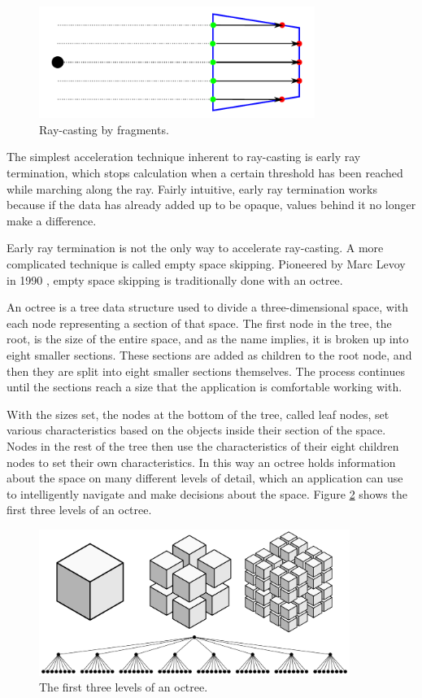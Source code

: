 \documentclass{report}
\begin{document}
\begin{figure}
\centering
\includegraphics[width=0.8\textwidth]{fragment-ray-casting.pdf}
\caption{Ray-casting by fragments.}
\label{fragment-ray-casting}
\end{figure}

The simplest acceleration technique inherent to ray-casting is early ray
termination, which stops calculation when a certain threshold has been reached
while marching along the ray.  Fairly intuitive, early ray termination works
because if the data has already added up to be opaque, values behind it no
longer make a difference.

Early ray termination is not the only way to accelerate ray-casting. A more
complicated technique is called empty space skipping.  Pioneered by Marc Levoy
in 1990 \cite{Levoy90}, empty space skipping is traditionally done with an
octree.

An octree is a tree data structure used to divide a three-dimensional space,
with each node representing a section of that space.  The first node in the
tree, the root, is the size of the entire space, and as the name implies, it is
broken up into eight smaller sections.  These sections are added as children to
the root node, and then they are split into eight smaller sections themselves.
The process continues until the sections reach a size that the application is
comfortable working with.

With the sizes set, the nodes at the bottom of the tree, called leaf nodes, set
various characteristics based on the objects inside their section of the space.
Nodes in the rest of the tree then use the characteristics of their eight
children nodes to set their own characteristics.  In this way an octree holds
information about the space on many different levels of detail, which an
application can use to intelligently navigate and make decisions about the
space.  Figure \ref{octree} shows the first three levels of an octree.

\begin{figure}
\centering
\includegraphics[width=0.9\textwidth]{octree.pdf}
\caption{The first three levels of an octree.}
\label{octree}
\end{figure}
\end{document}
